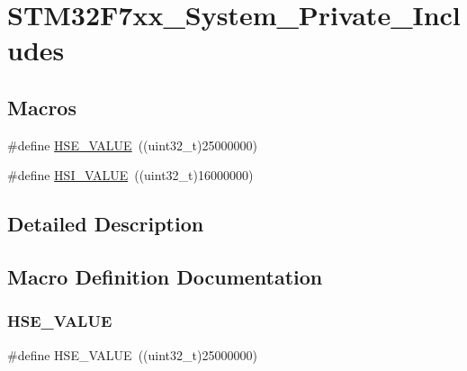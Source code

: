 \hypertarget{group___s_t_m32_f7xx___system___private___includes}{}\section{S\+T\+M32\+F7xx\+\_\+\+System\+\_\+\+Private\+\_\+\+Includes}
\label{group___s_t_m32_f7xx___system___private___includes}
\subsection*{Macros}
\begin{DoxyCompactItemize}
\item 
\#define \hyperlink{group___s_t_m32_f7xx___system___private___includes_gaeafcff4f57440c60e64812dddd13e7cb}{H\+S\+E\+\_\+\+V\+A\+L\+UE}~((uint32\+\_\+t)25000000)
\item 
\#define \hyperlink{group___s_t_m32_f7xx___system___private___includes_gaaa8c76e274d0f6dd2cefb5d0b17fbc37}{H\+S\+I\+\_\+\+V\+A\+L\+UE}~((uint32\+\_\+t)16000000)
\end{DoxyCompactItemize}


\subsection{Detailed Description}


\subsection{Macro Definition Documentation}
\mbox{\label{group___s_t_m32_f7xx___system___private___includes_gaeafcff4f57440c60e64812dddd13e7cb}} 
\subsubsection{\texorpdfstring{H\+S\+E\+\_\+\+V\+A\+L\+UE}{HSE\_VALUE}}
{\footnotesize\ttfamily \#define H\+S\+E\+\_\+\+V\+A\+L\+UE~((uint32\+\_\+t)25000000)}

